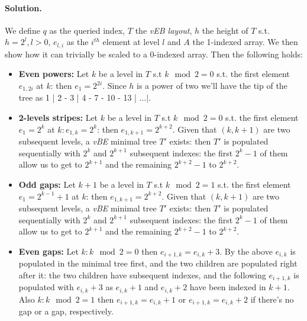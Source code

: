 \paragraph{Solution.}
We define $q$ as the queried index, $T$ the \emph{vEB layout}, $h$ the height of $T$ s.t. $h = 2^l, l > 0$, $e_{l, i}$ as the $i^{th}$ element at level $l$ and $A$ the 1-indexed array.
We then show how it can trivially be scaled to a 0-indexed array.
Then the following holds:
\begin{itemize}
    \label{15_even_power} \item \textbf{Even powers:} Let $k$ be a level in $T$ s.t $k \mod 2 = 0$ s.t. the first element $e_{1, 2i}$ at $k$: then $e_1 = 2^{2i}$.
    Since $h$ is a power of two we'll have the tip of the tree as 1 | 2 - 3 | 4 - 7 - 10 - 13 | $\dots |$.
    \label{15_2-level_stripe}~\item \textbf{2-levels stripes:} Let $k$ be a level in $T$ s.t $k \mod 2 = 0$ s.t. the first element $e_1 = 2^k$ at $k: e_{1, k} = 2^k$: then $e_{1, k + 1} = 2^{k + 2}$.
    Given that $(k, k + 1)$ are two subsequent levels, a \emph{vBE} minimal tree $T'$ exists: then $T'$ is populated sequentially with $2^k$ and $2^{k + 1}$ subsequent indexes: the first $2^k - 1$ of them allow us to get to $2^{k + 1}$ and the remaining $2^{k + 2} - 1$ to $2^{k + 2}$.
    \label{15_k_plus_1_gap}~\item \textbf{Odd gaps:} Let $k + 1$ be a level in $T$ s.t $k \mod 2 = 1$ s.t. the first element $e_1 = 2^{k - 1} + 1$ at $k$: then $e_{1, k + 1} = 2^{k + 2}$.
    Given that $(k, k + 1)$ are two subsequent levels, a \emph{vBE} minimal tree $T'$ exists: then $T'$ is populated sequentially with $2^k$ and $2^{k + 1}$ subsequent indexes: the first $2^k - 1$ of them allow us to get to $2^{k + 1}$ and the remaining $2^{k + 2} - 1$ to $2^{k + 2}$.
    \label{15_k_plus_3_gap}~\item \textbf{Even gaps:} Let $k: k \mod 2 = 0$ then $e_{i + 1, k} = e_{i, k} + 3$.
    By the above $e_{i, k}$ is populated in the minimal tree first, and the two children are populated right after it: the two children have subsequent indexes, and the following $e_{i + 1, k}$ is populated with $e_{i, k} + 3$ as $e_{i, k} + 1$ and $e_{i, k} + 2$ have been indexed in $k + 1$.
    Also $k: k \mod 2 = 1$ then $e_{i + 1, k} = e_{i, k} + 1$ or $e_{i + 1, k} = e_{i, k} + 2$ if there's no gap or a gap, respectively.
\end{itemize}

